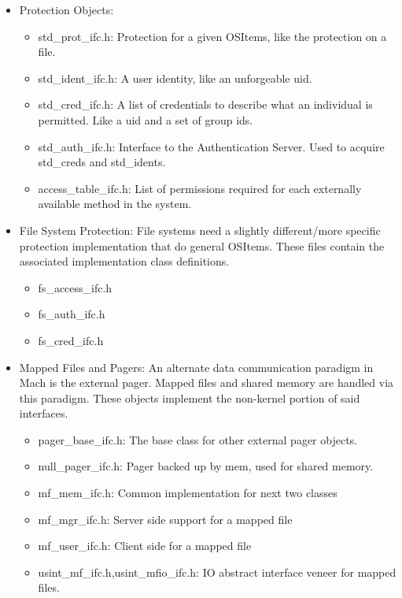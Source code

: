 \begin{itemize}
\item{Protection Objects}:
\begin{itemize}
\item{std\_prot\_ifc.h}: Protection for a given OSItems, like the 
protection on a file.
\item{std\_ident\_ifc.h}: A user identity, like an unforgeable uid.
\item{std\_cred\_ifc.h}: A list of credentials to describe what an individual
is permitted.  Like a uid and a set of group ids.
\item{std\_auth\_ifc.h}: Interface to the Authentication Server.  Used to acquire
std\_creds and std\_idents.
\item{access\_table\_ifc.h}:  List of permissions required for each externally
available method in the system.
\end{itemize}

\item{File System Protection}:
File systems need a slightly different/more specific protection implementation
that do general OSItems.  These files contain the associated implementation
class definitions.
\begin{itemize}
\item{fs\_access\_ifc.h}
\item{fs\_auth\_ifc.h}
\item{fs\_cred\_ifc.h}
\end{itemize}

\item{Mapped Files and Pagers}:
An alternate data communication paradigm in Mach is the external pager.
Mapped files and shared memory are handled via this paradigm.
These objects implement the non-kernel portion of said interfaces.
\begin{itemize}
\item{pager\_base\_ifc.h}:  The base class for other external pager objects.
\item{null\_pager\_ifc.h}: Pager backed up by mem, used for shared memory.
\item{mf\_mem\_ifc.h}: Common implementation for next two classes
\item{mf\_mgr\_ifc.h}: Server side support for a mapped file
\item{mf\_user\_ifc.h}: Client side for a mapped file
\item{usint\_mf\_ifc.h,usint\_mfio\_ifc.h}: IO abstract interface veneer for mapped
files.
\end{itemize}


\end{itemize}
